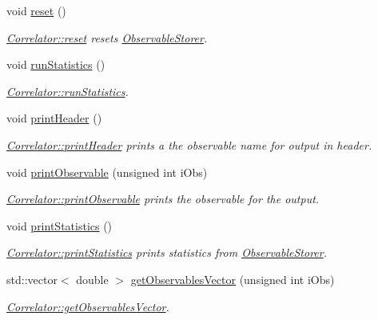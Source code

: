 \begin{DoxyCompactItemize}
void \mbox{\hyperlink{class_master_sampler_topc_x_y_z_aef8d0b1b431711c6410cfece1c007b4a}{reset}} ()
\begin{DoxyCompactList}\small\item\em \mbox{\hyperlink{class_correlator_aacca40262d2cd62f0a3964e832f948c1}{Correlator\+::reset}} resets \mbox{\hyperlink{class_observable_storer}{Observable\+Storer}}. \end{DoxyCompactList}\item 
void \mbox{\hyperlink{class_master_sampler_topc_x_y_z_af748653ded9908f78383185475b9ddeb}{run\+Statistics}} ()
\begin{DoxyCompactList}\small\item\em \mbox{\hyperlink{class_correlator_a35197b1d12b62ef30b79c0138a26456e}{Correlator\+::run\+Statistics}}. \end{DoxyCompactList}\item 
void \mbox{\hyperlink{class_master_sampler_topc_x_y_z_a630a504ecbf3ceb517ebeefb39c3faff}{print\+Header}} ()
\begin{DoxyCompactList}\small\item\em \mbox{\hyperlink{class_correlator_ac7c5a07d7cbee97c417a1659b93083b2}{Correlator\+::print\+Header}} prints a the observable name for output in header. \end{DoxyCompactList}\item 
void \mbox{\hyperlink{class_master_sampler_topc_x_y_z_ab2312c9e9dc1e9deeb5bce36784372ac}{print\+Observable}} (unsigned int i\+Obs)
\begin{DoxyCompactList}\small\item\em \mbox{\hyperlink{class_correlator_a15744ddb9f2b71fff34ac762d101df38}{Correlator\+::print\+Observable}} prints the observable for the output. \end{DoxyCompactList}\item 
void \mbox{\hyperlink{class_master_sampler_topc_x_y_z_a5a34a7f90ce8eea6c0efa06cfdfeb5f1}{print\+Statistics}} ()
\begin{DoxyCompactList}\small\item\em \mbox{\hyperlink{class_correlator_a2168d677f547769784781d2e2aaa53cf}{Correlator\+::print\+Statistics}} prints statistics from \mbox{\hyperlink{class_observable_storer}{Observable\+Storer}}. \end{DoxyCompactList}\item 
std\+::vector$<$ double $>$ \mbox{\hyperlink{class_master_sampler_topc_x_y_z_a1a922db23320ff46f8f736788c6977bb}{get\+Observables\+Vector}} (unsigned int i\+Obs)
\begin{DoxyCompactList}\small\item\em \mbox{\hyperlink{class_correlator_a7fb062b098beb078f3e546f4717b4941}{Correlator\+::get\+Observables\+Vector}}. \end{DoxyCompactList}\item 

\end{DoxyCompactItemize}
